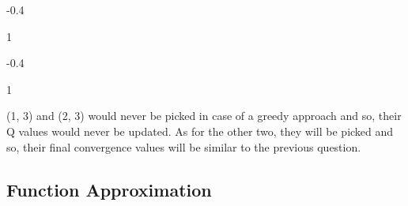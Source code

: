 \documentclass[11pt,addpoints,answers]{exam}
\begin{document}
\begin{questions}
\begin{parts}
\begin{your_solution}[title=Q(1\text{, }3),height=2cm,width=3cm]
    -0.4
\end{your_solution}
\begin{your_solution}[title=Q(1\text{, }10),height=2cm,width=3cm]
    1 
\end{your_solution}
\begin{your_solution}[title=Q(2\text{, }3),height=2cm,width=3cm]
    -0.4 
\end{your_solution}
\begin{your_solution}[title=Q(2\text{, }5),height=2cm,width=3cm]
    1 
\end{your_solution}

\begin{your_solution}[title=Work,height=6cm,width=15cm]
(1, 3) and (2, 3) would never be picked in case of a greedy approach and so, their Q values would never be updated. As for the other two, they will be picked and so, their final convergence values will be similar to the previous question.
\end{your_solution}
\end{parts}

\end{questions}



\clearpage
\subsection{Function Approximation}
\label{sec:FA}
\end{document}
